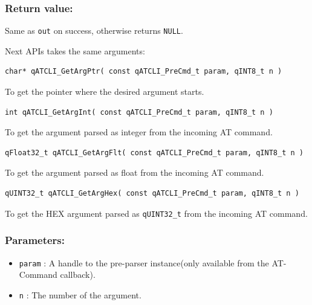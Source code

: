 \documentclass{article}
\begin{document}
\subsubsection*{Return value:}
Same as \lstinline{out} on success, otherwise returns \lstinline{NULL}.

\noindent\hrulefill
\newline
Next APIs takes the same arguments: \\

\begin{lstlisting}[style=CStyle]
char* qATCLI_GetArgPtr( const qATCLI_PreCmd_t param, qINT8_t n )
\end{lstlisting}

To get the pointer where the desired argument starts. 

\begin{lstlisting}[style=CStyle]
int qATCLI_GetArgInt( const qATCLI_PreCmd_t param, qINT8_t n )
\end{lstlisting}

To get the argument parsed as integer from the incoming AT command. 

\begin{lstlisting}[style=CStyle]
qFloat32_t qATCLI_GetArgFlt( const qATCLI_PreCmd_t param, qINT8_t n )
\end{lstlisting}

To get the argument parsed as float from the incoming AT command. 

\begin{lstlisting}[style=CStyle]
qUINT32_t qATCLI_GetArgHex( const qATCLI_PreCmd_t param, qINT8_t n )
\end{lstlisting}

To get the HEX argument parsed as \lstinline{qUINT32_t} from the incoming AT command. 


\subsubsection*{Parameters:}
\begin{itemize}
    \item \lstinline{param} : A handle to the pre-parser instance(only available from the AT-Command callback).
    \item \lstinline{n} : The number of the argument.
\end{itemize}
\end{document}
